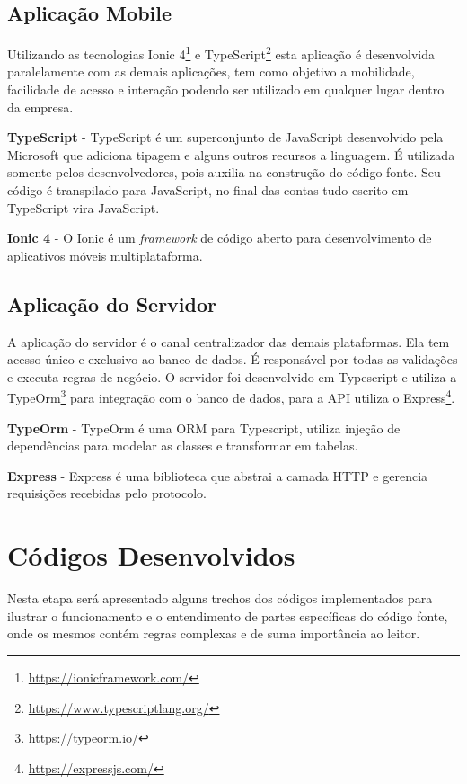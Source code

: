 \subsection{Aplicação Mobile}
Utilizando as tecnologias Ionic 4\footnote{\url{https://ionicframework.com/}} e TypeScript\footnote{\url{https://www.typescriptlang.org/}} esta aplicação é desenvolvida paralelamente com as demais aplicações, tem como objetivo a mobilidade, facilidade de acesso e interação podendo ser utilizado em qualquer lugar dentro da empresa.

{\textbf{TypeScript} - TypeScript é um superconjunto de JavaScript desenvolvido pela Microsoft que adiciona tipagem e alguns outros recursos a linguagem. É utilizada somente pelos desenvolvedores, pois auxilia na construção do código fonte. Seu código é transpilado para JavaScript, no final das contas tudo escrito em TypeScript vira JavaScript.}

{\textbf{Ionic 4} - O Ionic é um \textit{framework} de código aberto para desenvolvimento de aplicativos móveis multiplataforma.}

\subsection{Aplicação do Servidor}
A aplicação do servidor é o canal centralizador das demais plataformas. Ela tem acesso único e exclusivo ao banco de dados. É responsável por todas as validações e executa regras de negócio.
O servidor foi desenvolvido em Typescript e utiliza a TypeOrm\footnote{\url{https://typeorm.io/}} para integração com o banco de dados, para a API utiliza o Express\footnote{\url{https://expressjs.com/}}.

{\textbf{TypeOrm} - TypeOrm é uma ORM para Typescript, utiliza injeção de dependências para modelar as classes e transformar em tabelas.}

{\textbf{Express} - Express é uma biblioteca que abstrai a camada HTTP e gerencia requisições recebidas pelo protocolo.}


\section{Códigos Desenvolvidos} 

Nesta etapa será apresentado alguns trechos dos códigos implementados para ilustrar o funcionamento e o entendimento de partes específicas do código fonte, onde os mesmos contém regras complexas e de suma importância ao leitor.

